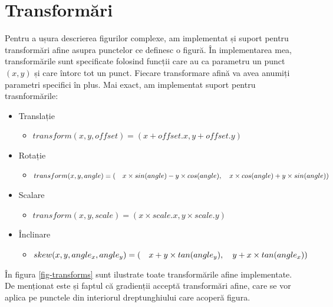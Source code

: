 \documentclass[a4paper, 12pt]{report}
\begin{document}
\section{Transformări}

Pentru a ușura descrierea figurilor complexe, am implementat și suport pentru transformări afine asupra punctelor ce definesc
o figură. În implementarea mea, transformările sunt specificate folosind funcții care au ca parametru un punct \((x, y)\) și
care întorc tot un punct. Fiecare transformare afină va avea anumiți parametri specifici în plus.
Mai exact, am implementat suport pentru trasnformările:

\newpage

\begin{itemize}
    \item{Translație}
    \begin{itemize}
        \item \(transform(x, y, offset) = (x + offset.x, y + offset.y)\)
    \end{itemize}
    \item{Rotație}
    \begin{itemize}
        \item \(transform(x, y, angle) = (\\
              \ \ \ x \times sin(angle) - y \times cos(angle),\\
              \ \ \ x \times cos(angle) + y \times sin(angle)\\
              )\)
    \end{itemize}
    \item{Scalare}
    \begin{itemize}
        \item \(transform(x, y, scale) = (x \times scale.x, y \times scale.y)\)
    \end{itemize}
    \item{Înclinare}
    \begin{itemize}
        \item \(skew(x, y, angle_x, angle_y) = (\\
              \ \ \ x + y \times tan(angle_y),\\
              \ \ \ y + x \times tan(angle_x)\\
              )\)
    \end{itemize}
\end{itemize}

În figura \ref{fig-transforms} sunt ilustrate toate transformările afine implementate. De menționat este și faptul că gradienții
acceptă transformări afine, care se vor aplica pe punctele din interiorul dreptunghiului care acoperă figura.
\end{document}
